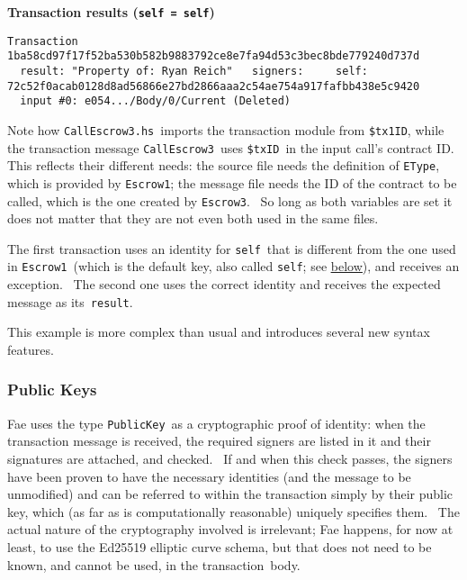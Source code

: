\documentclass[11pt]{article}
\newcommand{\codeblock}[1]{\begin{mdframed}[
    backgroundcolor=header-color,
    linecolor=header-color,
    innertopmargin=10pt,
    ]{\texttt{#1}}\end{mdframed}}
\DeclareRobustCommand{\fuline}[1]{\texorpdfstring{\uline{#1}}{#1}}
\begin{document}
\textbf{Transaction results (}\textbf{\texttt{self = self}}\textbf{)}

\codeblock{Transaction 1ba58cd97f17f52ba530b582b9883792ce8e7fa94d53c3bec8bde779240d737d\newline
  result: "Property of: Ryan Reich"\newline
  signers:\newline
    self: 72c52f0acab0128d8ad56866e27bd2866aaa2c54ae754a917fafbb438e5c9420\newline
  input \#0: e054...\slash{}Body\slash{}0\slash{}Current (Deleted)}

Note how \texttt{CallEscrow3.hs} imports the transaction module from \texttt{\$tx1ID}, while the transaction message \texttt{CallEscrow3} uses \texttt{\$txID} in the input call's contract ID.  This reflects their different needs: the source file needs the definition of \texttt{EType}, which is provided by \texttt{Escrow1}; the message file needs the ID of the contract to be called, which is the one created by \texttt{Escrow3}.  So long as both variables are set it does not matter that they are not even both used in the same files.


\vspace{11pt}

The first transaction uses an identity for \texttt{self} that is different from the one used in \texttt{Escrow1} (which is the default key, also called \texttt{self}; see \href{https://consensys.quip.com/2wGTAw6Fgm87/Tutorial-2-Escrows\%23ZRIACAoIEoz}{\fuline{below}}), and receives an exception.  The second one uses the correct identity and receives the expected message as its \texttt{result}.


\vspace{11pt}

This example is more complex than usual and introduces several new syntax features.

\subsubsection{Public Keys}
\vspace{5.5pt}

Fae uses the type \texttt{PublicKey} as a cryptographic proof of identity: when the transaction message is received, the required signers are listed in it and their signatures are attached, and checked.  If and when this check passes, the signers have been proven to have the necessary identities (and the message to be unmodified) and can be referred to within the transaction simply by their public key, which (as far as is computationally reasonable) uniquely specifies them.  The actual nature of the cryptography involved is irrelevant; Fae happens, for now at least, to use the Ed25519 elliptic curve schema, but that does not need to be known, and cannot be used, in the transaction body.
\end{document}

